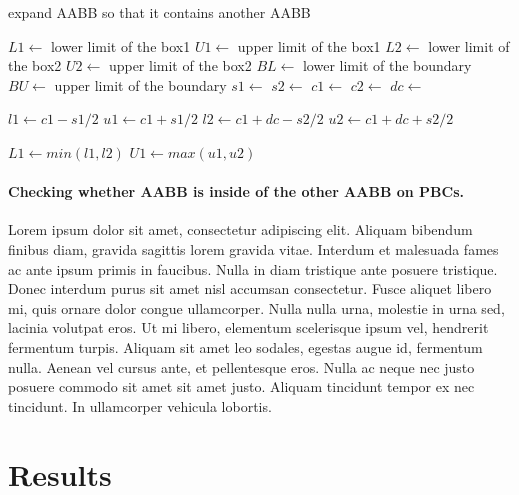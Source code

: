 \documentclass[10pt,letterpaper,twocolumn]{article}
\begin{document}
\begin{algorithm}
    \caption{expand AABB so that it contains another AABB}
    \label{expand_aabb_aabb}
    \begin{algorithmic}
        \State $L1 \gets$ lower limit of the box1
        \State $U1 \gets$ upper limit of the box1
        \State $L2 \gets$ lower limit of the box2
        \State $U2 \gets$ upper limit of the box2
        \State $BL \gets$ lower limit of the boundary
        \State $BU \gets$ upper limit of the boundary
            \State $s1 \gets$ 
            \State $s2 \gets$ 
            \State $c1 \gets$ 
            \State $c2 \gets$ 
            \State $dc \gets$ 

            \State $l1 \gets c1 - s1 / 2$
            \State $u1 \gets c1 + s1 / 2$
            \State $l2 \gets c1 + dc - s2 / 2$
            \State $u2 \gets c1 + dc + s2 / 2$

            \State $L1 \gets min(l1, l2)$
            \State $U1 \gets max(u1, u2)$
            \State {}
            \State \Return
        \EndFunction
     \end{algorithmic}
\end{algorithm}

\paragraph{Checking whether AABB is inside of the other AABB on PBCs.}
Lorem ipsum dolor sit amet, consectetur adipiscing elit. Aliquam bibendum
finibus diam, gravida sagittis lorem gravida vitae. Interdum et malesuada fames
ac ante ipsum primis in faucibus. Nulla in diam tristique ante posuere
tristique. Donec interdum purus sit amet nisl accumsan consectetur. Fusce
aliquet libero mi, quis ornare dolor congue ullamcorper. Nulla nulla urna,
molestie in urna sed, lacinia volutpat eros. Ut mi libero, elementum scelerisque
ipsum vel, hendrerit fermentum turpis. Aliquam sit amet leo sodales, egestas
augue id, fermentum nulla. Aenean vel cursus ante, et pellentesque eros. Nulla
ac neque nec justo posuere commodo sit amet sit amet justo. Aliquam tincidunt
tempor ex nec tincidunt. In ullamcorper vehicula lobortis.

\section*{Results}
\end{document}
